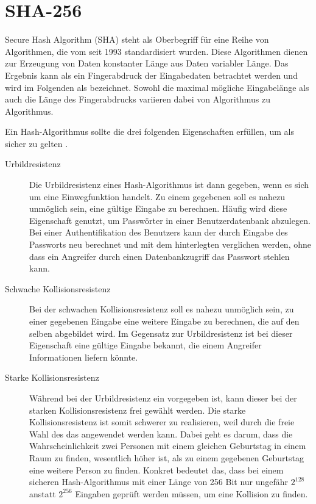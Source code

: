 \chapter{SHA-256}
\label{chp:sha256}

Secure Hash Algorithm (SHA) steht als Oberbegriff für eine Reihe von Algorithmen, die vom  seit 1993 standardisiert wurden.
Diese Algorithmen dienen zur Erzeugung von Daten konstanter Länge aus Daten variabler Länge.
Das Ergebnis kann als ein Fingerabdruck der Eingabedaten betrachtet werden und wird im Folgenden als  bezeichnet.
Sowohl die maximal mögliche Eingabelänge als auch die Länge des Fingerabdrucks variieren dabei von Algorithmus zu Algorithmus.

Ein Hash-Algorithmus sollte die drei folgenden Eigenschaften erfüllen, um als sicher zu gelten \cite{crypto1}.
\begin{description}
  \item[Urbildresistenz] Die Urbildresistenz eines Hash-Algorithmus ist dann gegeben, wenn es sich um eine Einwegfunktion handelt.
                         Zu einem gegebenen  soll es nahezu unmöglich sein, eine gültige Eingabe zu berechnen.
                         Häufig wird diese Eigenschaft genutzt, um Passwörter in einer Benutzerdatenbank abzulegen.
                         Bei einer Authentifikation des Benutzers kann der  durch Eingabe des Passworts neu berechnet und mit dem 
                         hinterlegten  verglichen werden, ohne dass ein Angreifer durch einen Datenbankzugriff das Passwort stehlen kann.
  \item[Schwache Kollisionsresistenz]
                         Bei der schwachen Kollisionsresistenz soll es nahezu unmöglich sein, zu einer gegebenen Eingabe eine weitere Eingabe zu berechnen,
                         die auf den selben  abgebildet wird. Im Gegensatz zur Urbildresistenz ist bei dieser Eigenschaft eine gültige
                         Eingabe bekannt, die einem Angreifer Informationen liefern könnte.
  \item[Starke Kollisionsresistenz]
                         Während bei der Urbildresistenz ein  vorgegeben ist, kann dieser bei der starken Kollisionsresistenz frei gewählt werden.
                         Die starke Kollisionsresistenz ist somit schwerer zu realisieren, weil durch die freie Wahl des  das 
                         angewendet werden kann. Dabei geht es darum, dass die Wahrscheinlichkeit zwei Personen mit einem gleichen Geburtstag in einem Raum
                         zu finden, wesentlich höher ist, als zu einem gegebenen Geburtstag eine weitere Person zu finden. Konkret bedeutet das, dass
                         bei einem sicheren Hash-Algorithmus mit einer Länge von 256 Bit nur ungefähr $ 2^{128} $ anstatt $ 2^{256} $ Eingaben geprüft werden
                         müssen, um eine Kollision zu finden.                         
\end{description}

